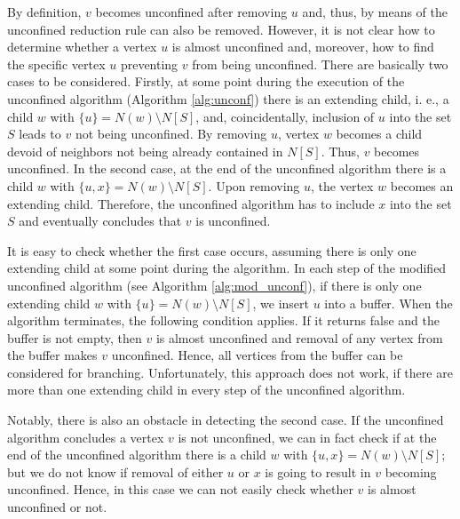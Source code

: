 \documentclass[12pt,a4paper,twoside]{scrartcl}
\numberwithin{equation}{section}
\begin{document}
By definition, $v$ becomes unconfined after removing $u$ and, thus, by means of the unconfined reduction rule can also be removed. However, it is not clear how to determine whether a vertex $u$ is almost unconfined and, moreover, how to find the specific vertex $u$ preventing $v$ from being unconfined. There are basically two cases to be considered. Firstly, at some point during the execution of the unconfined algorithm (Algorithm \ref{alg:unconf}) there is an extending child, i. e., a child $w$ with $\{u\} = N(w) \setminus N[S]$, and, coincidentally, inclusion of $u$ into the set $S$ leads to $v$ not being unconfined. By removing $u$, vertex $w$ becomes a child devoid of neighbors not being already contained in $N[S]$. Thus, $v$ becomes unconfined. In the second case, at the end of the unconfined algorithm there is a child $w$ with $\{u,x\} = N(w) \setminus N[S]$. Upon removing $u$, the vertex $w$ becomes an extending child. Therefore, the unconfined algorithm has to include $x$ into the set $S$ and eventually concludes that $v$ is unconfined. 

It is easy to check whether the first case occurs, assuming there is only one extending child at some point during the algorithm. In each step of the modified unconfined algorithm (see Algorithm \ref{alg:mod_unconf}), if there is only one extending child $w$ with $\{u\} = N(w) \setminus N[S]$, we insert $u$ into a buffer. When the algorithm terminates, the following condition applies. If it returns false and the buffer is not empty, then $v$ is almost unconfined and removal of any vertex from the buffer makes $v$ unconfined. Hence, all vertices from the buffer can be considered for branching. Unfortunately, this approach does not work, if there are more than one extending child in every step of the unconfined algorithm.

Notably, there is also an obstacle in detecting the second case. If the unconfined algorithm concludes a vertex $v$ is not unconfined, we can in fact check if at the end of the unconfined algorithm there is a child $w$ with $\{u,x\} = N(w) \setminus N[S]$; but we do not know if removal of either $u$ or $x$ is going to result in $v$ becoming unconfined. Hence, in this case we can not easily check whether $v$ is almost unconfined or not.
\end{document}
